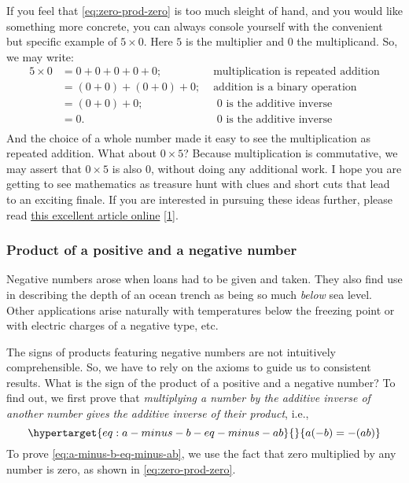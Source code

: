 \documentclass[
  a4paper,
]{article}
\begin{document}
If you feel that \cref{eq:zero-prod-zero} is too much sleight of hand,
and you would like something more concrete, you can always console
yourself with the convenient but specific example of \(5 \times 0\).
Here \(5\) is the multiplier and \(0\) the multiplicand. So, we may
write: \[
\begin{aligned}
5 \times 0 &= 0 + 0 + 0 + 0 + 0; & \mbox{ multiplication is repeated addition}\\
&= (0 + 0) + (0 + 0) + 0; & \mbox{ addition is a binary operation}\\
&= (0 + 0) + 0; & \mbox{ $0$ is the additive inverse}\\
&= 0. & \mbox{ $0$ is the additive inverse}\\
\end{aligned}
\] And the choice of a whole number made it easy to see the
multiplication as repeated addition. What about \(0 \times 5\)? Because
multiplication is commutative, we may assert that \(0 \times 5\) is also
\(0\), without doing any additional work. I hope you are getting to see
mathematics as treasure hunt with clues and short cuts that lead to an
exciting finale. If you are interested in pursuing these ideas further,
please read
\href{https://medium.com/swlh/why-a-0-0-and-other-proofs-of-the-obvious-da52dd0caefb}{this
excellent article online}
{[}\protect\hyperlink{ref-chodnicki2020}{1}{]}.

\hypertarget{product-of-a-positive-and-a-negative-number}{%
\subsubsection{Product of a positive and a negative
number}\label{product-of-a-positive-and-a-negative-number}}

Negative numbers arose when loans had to be given and taken. They also
find use in describing the depth of an ocean trench as being so much
\emph{below} sea level. Other applications arise naturally with
temperatures below the freezing point or with electric charges of a
negative type, etc.

The signs of products featuring negative numbers are not intuitively
comprehensible. So, we have to rely on the axioms to guide us to
consistent results. What is the sign of the product of a positive and a
negative number? To find out, we first prove that \emph{multiplying a
number by the additive inverse of another number gives the additive
inverse of their product}, i.e.,
\begin{equation}\protect\hypertarget{eq:a-minus-b-eq-minus-ab}{}{
a(-b) = -(ab)
}\label{eq:a-minus-b-eq-minus-ab}\end{equation} To prove
\cref{eq:a-minus-b-eq-minus-ab}, we use the fact that zero multiplied by
any number is zero, as shown in \cref{eq:zero-prod-zero}.
\end{document}
